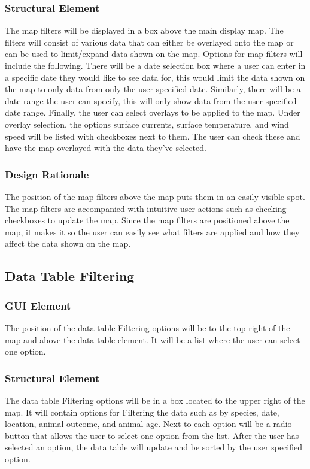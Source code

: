 \documentclass[onecolumn, draftclsnofoot,10pt, compsoc]{IEEEtran}
\begin{document}
\begin{singlespace}
        \subsubsection{Structural Element}
        The map filters will be displayed in a box above the main display map. The filters will consist of various data that can either be overlayed onto the map or can be used to limit/expand data shown on the map. Options for map filters will include the following. There will be a date selection box where a user can enter in a specific date they would like to see data for, this would limit the data shown on the map to only data from only the user specified date. Similarly, there will be a date range the user can specify, this will only show data from the user specified date range. Finally, the user can select overlays to be applied to the map. Under overlay selection, the options surface currents, surface temperature, and wind speed will be listed with checkboxes next to them. The user can check these and have the map overlayed with the data they've selected.
        \subsubsection{Design Rationale}
        The position of the map filters above the map puts them in an easily visible spot. The map filters are accompanied with intuitive user actions such as checking checkboxes to update the map. Since the map filters are positioned above the map, it makes it so the user can easily see what filters are applied and how they affect the data shown on the map.
    \subsection{Data Table Filtering}
        \subsubsection{GUI Element}
        The position of the data table Filtering options will be to the top right of the map and above the data table element. It will be a list where the user can select one option.
        \subsubsection{Structural Element}
        The data table Filtering options will be in a box located to the upper right of the map. It will contain options for Filtering the data such as by species, date, location, animal outcome, and animal age. Next to each option will be a radio button that allows the user to select one option from the list. After the user has selected an option, the data table will update and be sorted by the user specified option. 

\end{singlespace}
\end{document}
